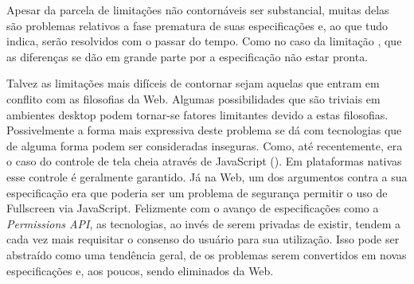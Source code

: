 Apesar da parcela de limitações não contornáveis ser substancial,
muitas delas são problemas relativos a fase prematura de suas
especificações e, ao que tudo indica, serão resolvidos com o passar
do tempo. Como no caso da limitação ,
que as diferenças se dão em grande parte por a especificação não
estar pronta.

Talvez as limitações mais difíceis de contornar sejam aquelas que
entram em conflito com as filosofias da Web. Algumas possibilidades
que são triviais em ambientes desktop podem tornar-se fatores
limitantes devido a estas filosofias. Possivelmente a forma mais
expressiva deste problema se dá com tecnologias que de alguma
forma podem ser consideradas inseguras. Como, até recentemente,
era o caso do controle de tela cheia através de JavaScript
(). Em plataformas nativas esse
controle é geralmente garantido. Já na Web, um dos argumentos contra
a sua especificação era que poderia ser um problema de segurança
permitir o uso de Fullscreen via JavaScript. Felizmente com o avanço de
especificações como a \textit{Permissions API}, as tecnologias, ao
invés de serem privadas de existir, tendem a cada vez mais requisitar
o consenso do usuário para sua utilização. Isso pode ser abstraído
como uma tendência geral, de os problemas serem convertidos em novas
especificações e, aos poucos, sendo eliminados da Web.
